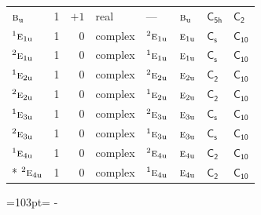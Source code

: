 \documentclass[10pt,a4paper]{article}
\newcommand{\needspace}[1]{\par\penalty-100\begingroup\dimen0=#1\relax\dimen2=\pagegoal
  \advance\dimen2-\pagetotal\ifdim\dimen0>\dimen2\relax\ifdim\dimen2>0pt\vfil\break\fi\fi
  \endgroup}
\numberwithin{equation}{section}
\newcommand{\grp}[1]{\mathsf{#1}}
\newcommand{\irr}[1]{\text{\normalfont\scshape #1}}
\newcommand{\conjpair}[1]{{}^{#1}}
\newcommand{\ptag}[1]{\mathrm{#1}}
\begin{document}
{\begin{longtable}{@{}lrrlllll@{}}
$\irr{b}_{\ptag{u}}$ & 1 & $+1$ & real & --- & $\irr{b}_{\ptag{u}}$ & \href{C5h.pdf}{$\grp{C_{5h}}$} & \href{C2.pdf}{$\grp{C_{2}}$}\\
$\conjpair{1}\irr{e}_{1\ptag{u}}$ & 1 & $0$ & complex & $\conjpair{2}\irr{e}_{1\ptag{u}}$ & $\irr{e}_{1\ptag{u}}$ & \href{C1v.pdf}{$\grp{C_{s}}$} & \href{C10.pdf}{$\grp{C_{10}}$}\\
$\conjpair{2}\irr{e}_{1\ptag{u}}$ & 1 & $0$ & complex & $\conjpair{1}\irr{e}_{1\ptag{u}}$ & $\irr{e}_{1\ptag{u}}$ & \href{C1v.pdf}{$\grp{C_{s}}$} & \href{C10.pdf}{$\grp{C_{10}}$}\\
$\conjpair{1}\irr{e}_{2\ptag{u}}$ & 1 & $0$ & complex & $\conjpair{2}\irr{e}_{2\ptag{u}}$ & $\irr{e}_{2\ptag{u}}$ & \href{C2.pdf}{$\grp{C_{2}}$} & \href{C10.pdf}{$\grp{C_{10}}$}\\
$\conjpair{2}\irr{e}_{2\ptag{u}}$ & 1 & $0$ & complex & $\conjpair{1}\irr{e}_{2\ptag{u}}$ & $\irr{e}_{2\ptag{u}}$ & \href{C2.pdf}{$\grp{C_{2}}$} & \href{C10.pdf}{$\grp{C_{10}}$}\\
$\conjpair{1}\irr{e}_{3\ptag{u}}$ & 1 & $0$ & complex & $\conjpair{2}\irr{e}_{3\ptag{u}}$ & $\irr{e}_{3\ptag{u}}$ & \href{C1v.pdf}{$\grp{C_{s}}$} & \href{C10.pdf}{$\grp{C_{10}}$}\\
$\conjpair{2}\irr{e}_{3\ptag{u}}$ & 1 & $0$ & complex & $\conjpair{1}\irr{e}_{3\ptag{u}}$ & $\irr{e}_{3\ptag{u}}$ & \href{C1v.pdf}{$\grp{C_{s}}$} & \href{C10.pdf}{$\grp{C_{10}}$}\\
$\conjpair{1}\irr{e}_{4\ptag{u}}$ & 1 & $0$ & complex & $\conjpair{2}\irr{e}_{4\ptag{u}}$ & $\irr{e}_{4\ptag{u}}$ & \href{C2.pdf}{$\grp{C_{2}}$} & \href{C10.pdf}{$\grp{C_{10}}$}\\*
$\conjpair{2}\irr{e}_{4\ptag{u}}$ & 1 & $0$ & complex & $\conjpair{1}\irr{e}_{4\ptag{u}}$ & $\irr{e}_{4\ptag{u}}$ & \href{C2.pdf}{$\grp{C_{2}}$} & \href{C10.pdf}{$\grp{C_{10}}$}\\
\bottomrule\end{longtable}}
\needspace{103pt}
\end{document}
